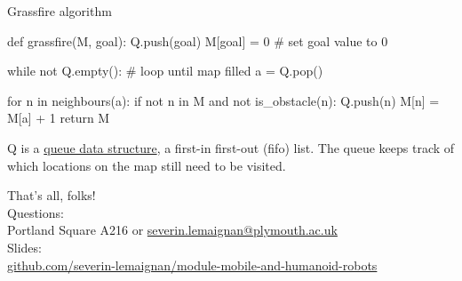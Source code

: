 \documentclass[compress,xcolor=table]{beamer}
\begin{document}
\begin{frame}[fragile]{Grassfire algorithm}

\begin{pythoncode}

def grassfire(M, goal):
    Q.push(goal)
    M[goal] = 0 # set goal value to 0

    while not Q.empty(): # loop until map filled
        a = Q.pop()

        for n in neighbours(a):
            if not n in M and not is_obstacle(n):
                Q.push(n)
                M[n] = M[a] + 1
    return M
\end{pythoncode}

Q is a \href{http://en.wikipedia.org/wiki/Queue_(abstract_data_type)}{queue
data structure}, a first-in first-out (fifo) list. The queue keeps track of
which locations on the map still need to be visited.

\end{frame}


\begin{frame}{}
    \begin{center}
        \Large
        That's all, folks!\\[2em]
        \normalsize
        Questions:\\
        Portland Square A216 or \url{severin.lemaignan@plymouth.ac.uk} \\[1em]

        Slides:\\ \href{https://github.com/severin-lemaignan/module-mobile-and-humanoid-robots}{\small github.com/severin-lemaignan/module-mobile-and-humanoid-robots}

    \end{center}
\end{frame}
\end{document}

